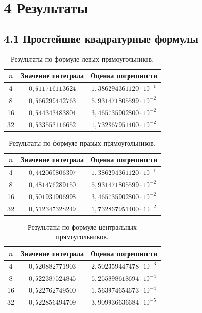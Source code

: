 \documentclass[14pt,a4paper]{extarticle}
\begin{document}
\newpage

\section*{4 Результаты}

\subsection*{4.1 Простейшие квадратурные формулы}

\begin{table}[H]
\centering
\caption{Результаты по формуле левых прямоугольников.}
\small
\begin{tabular}{|c|c|c|}
\hline
$n$ & Значение интеграла & Оценка погрешности \\ \hline
4 & $0{,}611716113624$ & $1{,}386294361120\cdot10^{-1}$ \\ \hline
8 & $0{,}566299442763$ & $6{,}931471805599\cdot10^{-2}$ \\ \hline
16 & $0{,}544343483804$ & $3{,}465735902800\cdot10^{-2}$ \\ \hline
32 & $0{,}533553116652$ & $1{,}732867951400\cdot10^{-2}$ \\ \hline
\end{tabular}
\end{table}

\begin{table}[H]
\centering
\caption{Результаты по формуле правых прямоугольников.}
\small
\begin{tabular}{|c|c|c|}
\hline
$n$ & Значение интеграла & Оценка погрешности \\ \hline
4 & $0{,}442069806397$ & $1{,}386294361120\cdot10^{-1}$ \\ \hline
8 & $0{,}481476289150$ & $6{,}931471805599\cdot10^{-2}$ \\ \hline
16 & $0{,}501931906998$ & $3{,}465735902800\cdot10^{-2}$ \\ \hline
32 & $0{,}512347328249$ & $1{,}732867951400\cdot10^{-2}$ \\ \hline
\end{tabular}
\end{table}

\begin{table}[H]
\centering
\caption{Результаты по формуле центральных прямоугольников.}
\small
\begin{tabular}{|c|c|c|}
\hline
$n$ & Значение интеграла & Оценка погрешности \\ \hline
4 & $0{,}520882771903$ & $2{,}502359447478\cdot10^{-3}$ \\ \hline
8 & $0{,}522387524845$ & $6{,}255898618694\cdot10^{-4}$ \\ \hline
16 & $0{,}522762749500$ & $1{,}563974654673\cdot10^{-4}$ \\ \hline
32 & $0{,}522856494709$ & $3{,}909936636684\cdot10^{-5}$ \\ \hline
\end{tabular}
\end{table}
\end{document}

